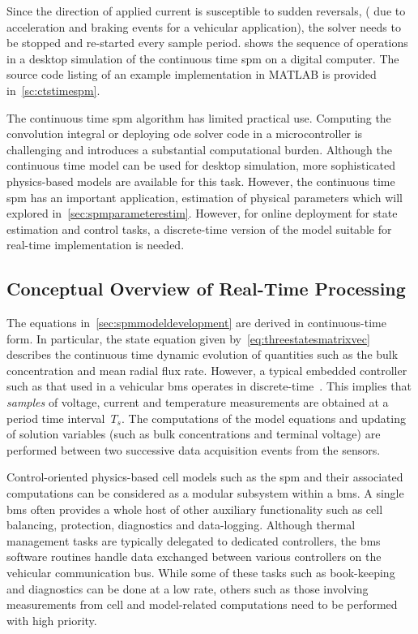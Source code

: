 Since  the direction  of applied  current  is susceptible  to sudden  reversals,
(\eg{}  due to  acceleration and  braking events  for a  vehicular application),
the  solver   needs  to   be  stopped  and   re-started  every   sample  period.
 shows the  sequence of operations in  a desktop simulation
of the continuous time \gls{spm} on  a digital computer. The source code listing
of an example implementation in MATLAB is provided in~\cref{sc:ctstimespm}.
\vspace{3ex}


The continuous time \gls{spm} algorithm has limited practical use. Computing the
convolution integral or deploying \gls{ode}  solver code in a microcontroller is
challenging  and introduces  a  substantial computational  burden. Although  the
continuous time  model can  be used for  desktop simulation,  more sophisticated
physics-based  models  are available  for  this  task. However,  the  continuous
time  \gls{spm} has  an  important application,  \viz{}  estimation of  physical
parameters  which will  explored  in~\cref{sec:spmparameterestim}. However,  for
online  deployment  for state  estimation  and  control tasks,  a  discrete-time
version of the model suitable for real-time implementation is needed.

\subsection{Conceptual Overview of Real-Time Processing}

The equations  in~\cref{sec:spmmodeldevelopment} are derived  in continuous-time
form. In particular, the  state equation given by~\cref{eq:threestatesmatrixvec}
describes  the  continuous   time  dynamic  evolution  of   quantities  such  as
the  bulk  concentration   and  mean  radial  flux  rate.   However,  a  typical
embedded  controller  such  as  that  used in  a  vehicular  \gls{bms}  operates
in   discrete-time~\cite{Andrea2010}.  This   implies  that   \emph{samples}  of
voltage,  current and  temperature measurements  are obtained  at a  period time
interval~$T_s$. The computations of the model equations and updating of solution
variables  (such as  bulk  concentrations and  terminal  voltage) are  performed
between two successive data acquisition events from the sensors.


Control-oriented  physics-based cell  models  such as  the  \gls{spm} and  their
associated  computations can  be  considered  as a  modular  subsystem within  a
\gls{bms}. A  single \gls{bms} often  provides a  whole host of  other auxiliary
functionality such as cell  balancing, protection, diagnostics and data-logging.
Although  thermal   management  tasks  are  typically   delegated  to  dedicated
controllers,  the  \gls{bms} software  routines  handle  data exchanged  between
various  controllers on  the vehicular  communication bus.  While some  of these
tasks such  as book-keeping and  diagnostics can be done  at a low  rate, others
such as  those involving measurements  from cell and  model-related computations
need to be performed with high priority.

